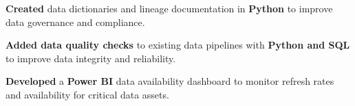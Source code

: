 
\begin{bullets}
	\item \textbf{Created} data dictionaries and lineage documentation in \textbf{Python} to improve data governance and compliance.
	\item \textbf{Added data quality checks} to existing data pipelines with \textbf{Python and SQL} to improve data integrity and reliability.
	\item \textbf{Developed} a \textbf{Power BI} data availability dashboard to monitor refresh rates and availability for critical data assets.
\end{bullets}
